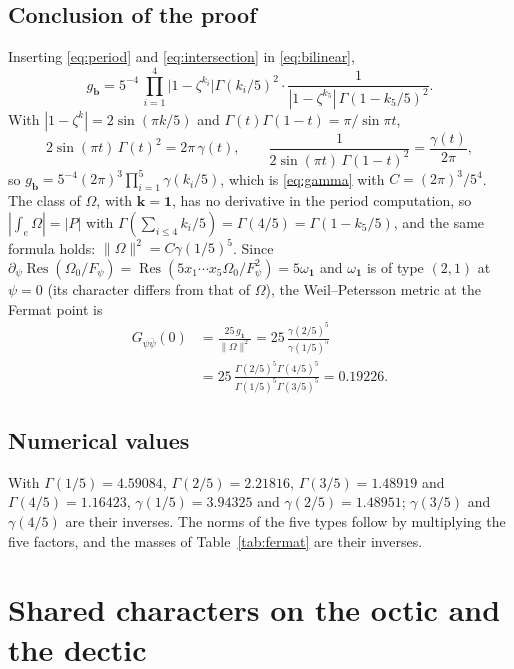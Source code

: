 \documentclass[11pt]{amsart}
\theoremstyle{definition}
\theoremstyle{remark}
\newcommand{\Res}{\operatorname{Res}}
\newcommand{\bb}{\mathbf{b}}
\newcommand{\one}{\mathbf{1}}
\begin{document}
\subsection{Conclusion of the proof}

Inserting \eqref{eq:period} and \eqref{eq:intersection} in
\eqref{eq:bilinear},
\[
g_{\bb}=5^{-4}\,\prod_{i=1}^4\big|1-\zeta^{k_i}\big|\Gamma(k_i/5)^2\cdot
\frac{1}{|1-\zeta^{k_5}|\,\Gamma(1-k_5/5)^2}.
\]
With $|1-\zeta^k|=2\sin(\pi k/5)$ and $\Gamma(t)\Gamma(1-t)=\pi/\sin\pi t$,
\[
2\sin(\pi t)\,\Gamma(t)^2=2\pi\,\gamma(t),\qquad
\frac{1}{2\sin(\pi t)\,\Gamma(1-t)^2}=\frac{\gamma(t)}{2\pi},
\]
so $g_{\bb}=5^{-4}(2\pi)^3\prod_{i=1}^5\gamma(k_i/5)$, which is
\eqref{eq:gamma} with $C=(2\pi)^3/5^4$. The class of $\Omega$, with
$\mathbf k=\one$, has no derivative in the period computation, so
$|\int_e\Omega|=|P|$ with $\Gamma(\sum_{i\le4}k_i/5)=\Gamma(4/5)=
\Gamma(1-k_5/5)$, and the same formula holds: $\|\Omega\|^2=C\gamma(1/5)^5$.
Since $\partial_\psi\Res(\Omega_0/F_\psi)=\Res(5x_1\cdots x_5\Omega_0/
F_\psi^2)=5\omega_{\one}$ and $\omega_{\one}$ is of type $(2,1)$ at
$\psi=0$ (its character differs from that of $\Omega$), the
Weil--Petersson metric at the Fermat point is
\begin{align*}
G_{\psi\bar\psi}(0)&=\frac{25\,g_{\one}}{\|\Omega\|^2}
=25\,\frac{\gamma(2/5)^5}{\gamma(1/5)^5}\\
&=25\,\frac{\Gamma(2/5)^5\Gamma(4/5)^5}{\Gamma(1/5)^5\Gamma(3/5)^5}=0.19226.
\end{align*}

\subsection{Numerical values}

With $\Gamma(1/5)=4.59084$, $\Gamma(2/5)=2.21816$, $\Gamma(3/5)=1.48919$
and $\Gamma(4/5)=1.16423$, $\gamma(1/5)=3.94325$ and $\gamma(2/5)=1.48951$;
$\gamma(3/5)$ and $\gamma(4/5)$ are their inverses. The norms of the
five types follow by multiplying the five factors, and the masses of
Table~\ref{tab:fermat} are their inverses.

\section{Shared characters on the octic and the dectic}\label{app:wlabels}
\end{document}
